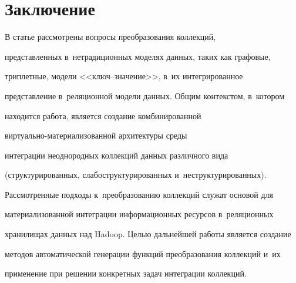 \vspace*{-4pt}



\section{Заключение}



      В статье рассмотрены вопросы преобразования коллекций,

представленных в~нетрадиционных моделях данных, таких как графовые,

триплетные, модели <<ключ--зна\-че\-ние>>, в~их интегрированное

представление в~реляционной модели данных. Общим контекстом, в~котором

находится работа, является создание комбинированной

      вир\-ту\-аль\-но-ма\-те\-ри\-а\-ли\-зо\-ван\-ной архитектуры среды

интеграции неоднородных коллекций данных различного вида

(структурированных, слабоструктурированных и~неструктурированных).

Рассмотренные подходы к~преобразованию коллекций служат основой для

материализованной интеграции информационных ресурсов в~реляционных

хранилищах данных над Hadoop. Целью дальнейшей работы является создание

методов автоматической генерации функций преобразования коллекций и~их

применение при решении конкретных задач интеграции коллекций.



\vspace*{-4pt}



